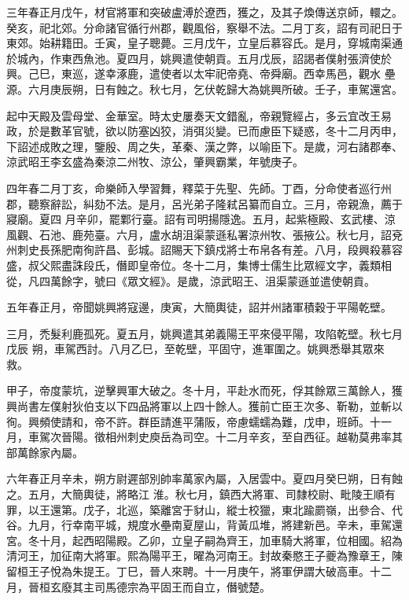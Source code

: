 \begin{pinyinscope}
 三年春正月戊午，材官將軍和突破盧溥於遼西，獲之，及其子煥傳送京師，轘之。癸亥，祀北郊。分命諸官循行州郡，觀風俗，察舉不法。二月丁亥，詔有司祀日于東郊。始耕籍田。壬寅，皇子聰薨。三月戊午，立皇后慕容氏。是月，穿城南渠通於城內，作東西魚池。夏四月，姚興遣使朝貢。五月戊辰，詔謁者僕射張濟使於興。己巳，東巡，遂幸涿鹿，遣使者以太牢祀帝堯、帝舜廟。西幸馬邑，觀水
 壘源。六月庚辰朔，日有蝕之。秋七月，乞伏乾歸大為姚興所破。壬子，車駕還宮。



 起中天殿及雲母堂、金華室。時太史屢奏天文錯亂，帝親覽經占，多云宜改王易政，於是數革官號，欲以防塞凶狡，消弭災變。已而慮臣下疑惑，冬十二月丙申，下詔述成敗之理，鑒殷、周之失，革秦、漢之弊，以喻臣下。是歲，河右諸郡奉、涼武昭王李玄盛為秦涼二州牧、涼公，肇興霸業，年號庚子。



 四年春二月丁亥，命樂師入學習舞，釋菜于先聖、先師。丁酉，分命使者巡行州郡，聽察辭訟，糾劾不法。是月，呂光弟子隆弒呂纂而自立。三月，帝親漁，薦于寢廟。夏四
 月辛卯，罷鄴行臺。詔有司明揚隱逸。五月，起紫極殿、玄武樓、涼風觀、石池、鹿苑臺。六月，盧水胡沮渠蒙遜私署涼州牧、張掖公。秋七月，詔兗州刺史長孫肥南徇許昌、彭城。詔賜天下鎮戍將士布帛各有差。八月，段興殺慕容盛，叔父熙盡誅段氏，僭即皇帝位。冬十二月，集博士儒生比眾經文字，義類相從，凡四萬餘字，號曰《眾文經》。是歲，涼武昭王、沮渠蒙遜並遣使朝貢。



 五年春正月，帝聞姚興將寇邊，庚寅，大簡輿徒，詔并州諸軍積穀于平陽乾壁。



 三月，禿髮利鹿孤死。夏五月，姚興遣其弟義陽王平來侵平陽，攻陷乾壁。秋七月戊辰
 朔，車駕西討。八月乙巳，至乾壁，平固守，進軍圍之。姚興悉舉其眾來救。



 甲子，帝度蒙坑，逆擊興軍大破之。冬十月，平赴水而死，俘其餘眾三萬餘人，獲興尚書左僕射狄伯支以下四品將軍以上四十餘人。獲前亡臣王次多、靳勒，並斬以徇。興頻使請和，帝不許。群臣請進平蒲阪，帝慮蠕蠕為難，戊申，班師。十一月，車駕次晉陽。徵相州刺史庾岳為司空。十二月辛亥，至自西征。越勒莫弗率其部萬餘家內屬。



 六年春正月辛未，朔方尉遲部別帥率萬家內屬，入居雲中。夏四月癸巳朔，日有蝕之。五月，大簡輿徒，將略江
 淮。秋七月，鎮西大將軍、司隸校尉、毗陵王順有罪，以王還第。戊子，北巡，築離宮于豺山，縱士校獵，東北踰罽嶺，出參合、代谷。九月，行幸南平城，規度水壘南夏屋山，背黃瓜堆，將建新邑。辛未，車駕還宮。冬十月，起西昭陽殿。乙卯，立皇子嗣為齊王，加車騎大將軍，位相國。紹為清河王，加征南大將軍。熙為陽平王，曜為河南王。封故秦愍王子夔為豫章王，陳留桓王子悅為朱提王。丁巳，晉人來聘。十一月庚午，將軍伊謂大破高車。十二月，晉桓玄廢其主司馬德宗為平固王而自立，僭號楚。




\end{pinyinscope}
